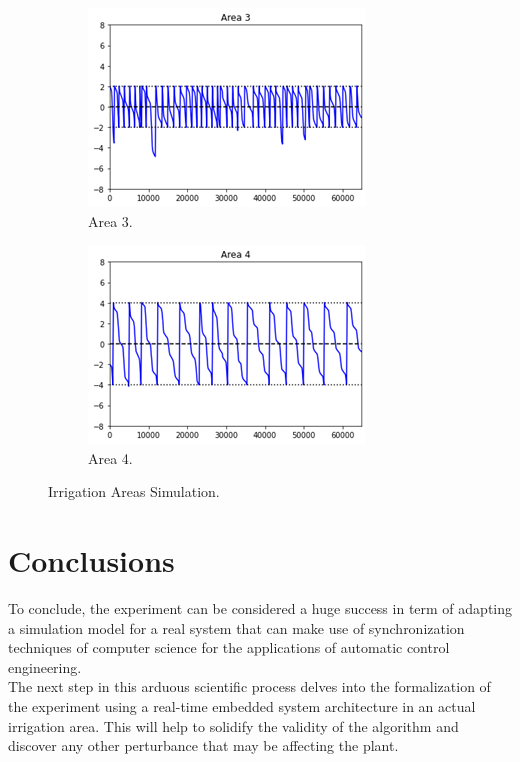 \documentclass[12pt]{article}
\begin{document}
\begin{figure}[h]
\begin{subfigure}[b]{0.475\textwidth}
\includegraphics[width=\textwidth]{area3}
\caption{Area 3.}
\end{subfigure}
\hfill
\begin{subfigure}[b]{0.475\textwidth}
\label{fig:3d}
\centering
\includegraphics[width=\textwidth]{area4}
\caption{Area 4.}
\end{subfigure}

\caption{Irrigation Areas Simulation.}
\end{figure}

\section{Conclusions}

To conclude, the experiment can be considered a huge success in term of adapting a simulation model for a real system that can make use of synchronization techniques of computer science for the applications of automatic control engineering. \\

The next step in this arduous scientific process delves into the formalization of the experiment using a real-time embedded system architecture in an actual irrigation area. This will help to solidify the validity of the algorithm and discover any other perturbance that may be affecting the plant. \\



\end{document}
